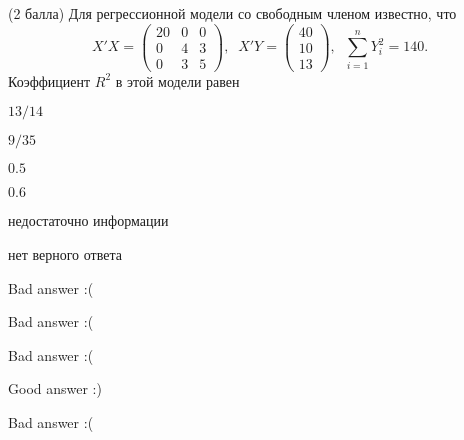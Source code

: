 
\begin{question}
(2 балла) Для регрессионной модели со свободным членом известно, что \[
X'X = \begin{pmatrix}
20 & 0 & 0 \\
0 & 4 & 3 \\
0 & 3 & 5
\end{pmatrix}, \; \;
X'Y = \begin{pmatrix}
40 \\
10 \\
13
\end{pmatrix}, \;\;
\sum_{i=1}^n Y_i^2 = 140.
\] Коэффициент \(R^2\) в этой модели равен
\begin{answerlist}
  \item \(13/14\)
  \item \(9/35\)
  \item \(0.5\)
  \item \(0.6\)
  \item недостаточно информации
  \item нет верного ответа
\end{answerlist}
\end{question}

\begin{solution}
\begin{answerlist}
  \item Bad answer :(
  \item Bad answer :(
  \item Bad answer :(
  \item Good answer :)
  \item Bad answer :(
\end{answerlist}
\end{solution}
